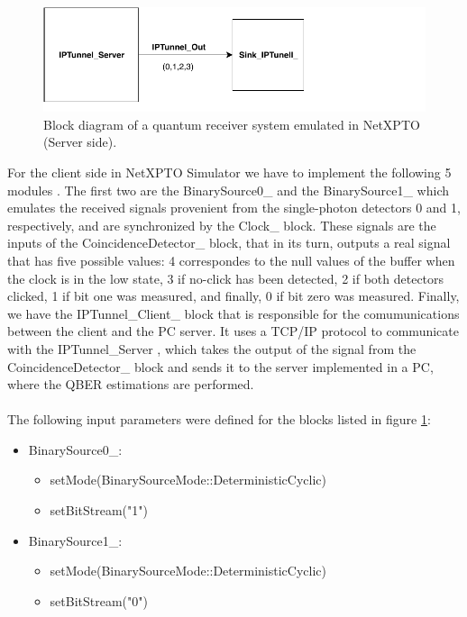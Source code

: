 \begin{refsection}
	\begin{figure}[H]
		\centering
		\includegraphics[width=0.9\linewidth]{./sdf/arduino_quantum_rx/figures/NetXPTO_2.pdf}
		\caption{Block diagram of a quantum receiver system emulated in NetXPTO (Server side).}
		\label{fig:netxpto}
	\end{figure}
	
	For the client side in NetXPTO Simulator we have to implement the following 5 modules . The first two are the BinarySource0\_ and the BinarySource1\_ which emulates the received signals provenient from the single-photon detectors 0 and 1, respectively, and are synchronized by the Clock\_ block. These signals are the inputs of the CoincidenceDetector\_ block, that in its turn, outputs a real signal that has five possible values: 4 correspondes to the null values of the buffer when the clock is in the low state, 3 if no-click has been detected, 2 if both detectors clicked, 1 if bit one was measured, and finally, 0 if bit zero was measured. Finally, we have the IPTunnel\_Client\_ block that is responsible for the comumunications between the client and the PC server. It uses a TCP/IP protocol to communicate with the IPTunnel\_Server , which takes the output of the signal from the CoincidenceDetector\_ block and sends it to the server implemented in a PC, where the QBER estimations are performed. \\ \\

	
	The following input parameters were defined for the blocks listed in figure \ref{fig:netxpto}:
	
	\begin{itemize}
		\item BinarySource0\_:
		\begin{itemize}
			\item setMode(BinarySourceMode::DeterministicCyclic)
			\item setBitStream("1")
		\end{itemize}
	
		\item BinarySource1\_:
		\begin{itemize}
			\item setMode(BinarySourceMode::DeterministicCyclic)
			\item setBitStream("0")
		\end{itemize}
		

\end{itemize}
\end{refsection}
